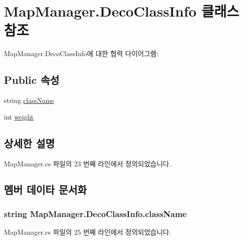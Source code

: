 \hypertarget{class_map_manager_1_1_deco_class_info}{}\section{Map\+Manager.\+Deco\+Class\+Info 클래스 참조}
\label{class_map_manager_1_1_deco_class_info}


Map\+Manager.\+Deco\+Class\+Info에 대한 협력 다이어그램\+:
\subsection*{Public 속성}
\begin{DoxyCompactItemize}
\item 
string \hyperlink{class_map_manager_1_1_deco_class_info_aa294d60b33f960fd11f4eedb25fe6ba4}{class\+Name}
\item 
int \hyperlink{class_map_manager_1_1_deco_class_info_a37049aed98cee0f82b631a6273e3a27b}{weight}
\end{DoxyCompactItemize}


\subsection{상세한 설명}


Map\+Manager.\+cs 파일의 23 번째 라인에서 정의되었습니다.



\subsection{멤버 데이타 문서화}
\subsubsection[{\texorpdfstring{class\+Name}{className}}]{\setlength{\rightskip}{0pt plus 5cm}string Map\+Manager.\+Deco\+Class\+Info.\+class\+Name}\hypertarget{class_map_manager_1_1_deco_class_info_aa294d60b33f960fd11f4eedb25fe6ba4}{}\label{class_map_manager_1_1_deco_class_info_aa294d60b33f960fd11f4eedb25fe6ba4}


Map\+Manager.\+cs 파일의 25 번째 라인에서 정의되었습니다.

